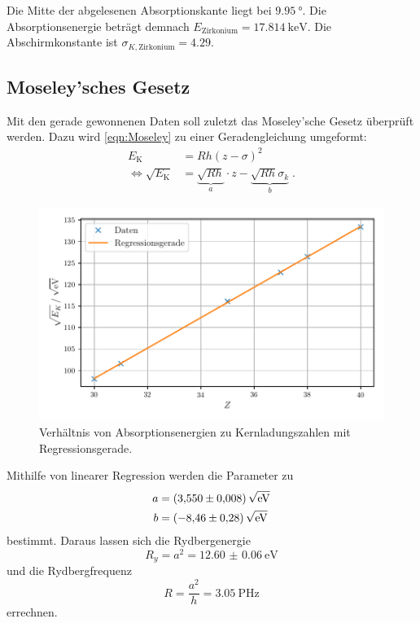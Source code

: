 Die Mitte der abgelesenen Absorptionskante liegt bei $\SI{9.95}{\degree}$.
Die Absorptionsenergie beträgt demnach $E_\text{Zirkonium} = \SI{17.814}{\kilo\electronvolt}$.
Die Abschirmkonstante ist $\sigma_{K, \text{Zirkonium}} = \num{4.29}$.


\newpage
\subsection{Moseley'sches Gesetz}
\label{sec:auswertung:moseley}

Mit den gerade gewonnenen Daten soll zuletzt das Moseley'sche Gesetz überprüft werden.
Dazu wird \autoref{eqn:Moseley} zu einer Geradengleichung umgeformt:
\begin{align*}
    E_\text{K} &= R h (z - \sigma)^2 \\
    \Leftrightarrow
    \sqrt{E_\text{K}} &= \underbrace{\sqrt{R h}}_a \cdot z - \underbrace{\sqrt{R h} \sigma_k}_b \; .
\end{align*}

\begin{figure}
    \centering
    \includegraphics[width=\textwidth]{build/plot_moseley.pdf}
    \caption{Verhältnis von Absorptionsenergien zu Kernladungszahlen mit Regressionsgerade.}
    \label{fig:moseley_regression}
\end{figure}

Mithilfe von linearer Regression werden die Parameter zu
\begin{align*}
    a &= \SI{3.550(8)}{\sqrt{\electronvolt}} \\
    b &= \SI{-8.46(28)}{\sqrt{\electronvolt}} \\
\end{align*}
bestimmt.
Daraus lassen sich die Rydbergenergie
\[ R_y = a^2 = \SI{12.60(6)}{\electronvolt} \]
und die Rydbergfrequenz
\[ R = \frac{a^2}{h} = \SI{3.05}{\peta\hertz} \]
errechnen.
